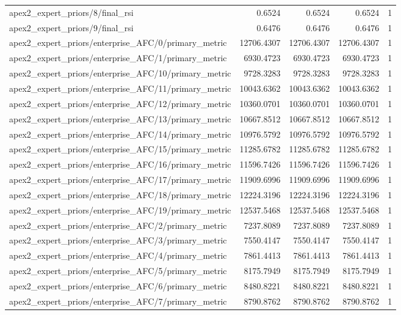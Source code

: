 \begin{table}[h]
\begin{tabular}{lrrrr}
apex2_expert_priors/8/final_rsi & 0.6524 & 0.6524 & 0.6524 & 1 \\
apex2_expert_priors/9/final_rsi & 0.6476 & 0.6476 & 0.6476 & 1 \\
apex2_expert_priors/enterprise_AFC/0/primary_metric & 12706.4307 & 12706.4307 & 12706.4307 & 1 \\
apex2_expert_priors/enterprise_AFC/1/primary_metric & 6930.4723 & 6930.4723 & 6930.4723 & 1 \\
apex2_expert_priors/enterprise_AFC/10/primary_metric & 9728.3283 & 9728.3283 & 9728.3283 & 1 \\
apex2_expert_priors/enterprise_AFC/11/primary_metric & 10043.6362 & 10043.6362 & 10043.6362 & 1 \\
apex2_expert_priors/enterprise_AFC/12/primary_metric & 10360.0701 & 10360.0701 & 10360.0701 & 1 \\
apex2_expert_priors/enterprise_AFC/13/primary_metric & 10667.8512 & 10667.8512 & 10667.8512 & 1 \\
apex2_expert_priors/enterprise_AFC/14/primary_metric & 10976.5792 & 10976.5792 & 10976.5792 & 1 \\
apex2_expert_priors/enterprise_AFC/15/primary_metric & 11285.6782 & 11285.6782 & 11285.6782 & 1 \\
apex2_expert_priors/enterprise_AFC/16/primary_metric & 11596.7426 & 11596.7426 & 11596.7426 & 1 \\
apex2_expert_priors/enterprise_AFC/17/primary_metric & 11909.6996 & 11909.6996 & 11909.6996 & 1 \\
apex2_expert_priors/enterprise_AFC/18/primary_metric & 12224.3196 & 12224.3196 & 12224.3196 & 1 \\
apex2_expert_priors/enterprise_AFC/19/primary_metric & 12537.5468 & 12537.5468 & 12537.5468 & 1 \\
apex2_expert_priors/enterprise_AFC/2/primary_metric & 7237.8089 & 7237.8089 & 7237.8089 & 1 \\
apex2_expert_priors/enterprise_AFC/3/primary_metric & 7550.4147 & 7550.4147 & 7550.4147 & 1 \\
apex2_expert_priors/enterprise_AFC/4/primary_metric & 7861.4413 & 7861.4413 & 7861.4413 & 1 \\
apex2_expert_priors/enterprise_AFC/5/primary_metric & 8175.7949 & 8175.7949 & 8175.7949 & 1 \\
apex2_expert_priors/enterprise_AFC/6/primary_metric & 8480.8221 & 8480.8221 & 8480.8221 & 1 \\
apex2_expert_priors/enterprise_AFC/7/primary_metric & 8790.8762 & 8790.8762 & 8790.8762 & 1 \\

\end{tabular}
\end{table}
